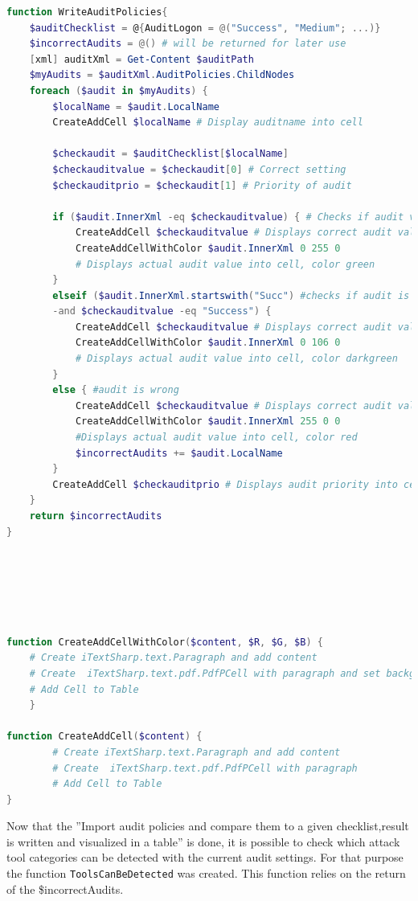 \begin{lstlisting}[caption=Functions WriteAuditPolicies \& CreateAddCellWithColor \& CreateAddCell, language=PowerShell]
function WriteAuditPolicies{
    $auditChecklist = @{AuditLogon = @("Success", "Medium"; ...)}
    $incorrectAudits = @() # will be returned for later use
    [xml] auditXml = Get-Content $auditPath
    $myAudits = $auditXml.AuditPolicies.ChildNodes
    foreach ($audit in $myAudits) {
        $localName = $audit.LocalName
        CreateAddCell $localName # Display auditname into cell

        $checkaudit = $auditChecklist[$localName]
        $checkauditvalue = $checkaudit[0] # Correct setting
        $checkauditprio = $checkaudit[1] # Priority of audit

        if ($audit.InnerXml -eq $checkauditvalue) { # Checks if audit values are equal
            CreateAddCell $checkauditvalue # Displays correct audit value
            CreateAddCellWithColor $audit.InnerXml 0 255 0 
            # Displays actual audit value into cell, color green  
        }
        elseif ($audit.InnerXml.startswith("Succ") #checks if audit is ''overpowered''
        -and $checkauditvalue -eq "Success") {
            CreateAddCell $checkauditvalue # Displays correct audit value
            CreateAddCellWithColor $audit.InnerXml 0 106 0 
            # Displays actual audit value into cell, color darkgreen
        }
        else { #audit is wrong
            CreateAddCell $checkauditvalue # Displays correct audit value
            CreateAddCellWithColor $audit.InnerXml 255 0 0 
            #Displays actual audit value into cell, color red
            $incorrectAudits += $audit.LocalName
        }
        CreateAddCell $checkauditprio # Displays audit priority into cell
    }
    return $incorrectAudits
}






function CreateAddCellWithColor($content, $R, $G, $B) {
    # Create iTextSharp.text.Paragraph and add content
    # Create  iTextSharp.text.pdf.PdfPCell with paragraph and set backgroundcolor $R $G $B
    # Add Cell to Table
    }

function CreateAddCell($content) {
        # Create iTextSharp.text.Paragraph and add content
        # Create  iTextSharp.text.pdf.PdfPCell with paragraph
        # Add Cell to Table
}
\end{lstlisting}
Now that the ''Import audit policies and compare them to a given checklist,result is written and visualized in a table'' is done, it is possible to check which attack tool categories can be detected with the current audit settings. For that purpose the function \lstinline|ToolsCanBeDetected| was created. This function relies on the return of the \$incorrectAudits.
